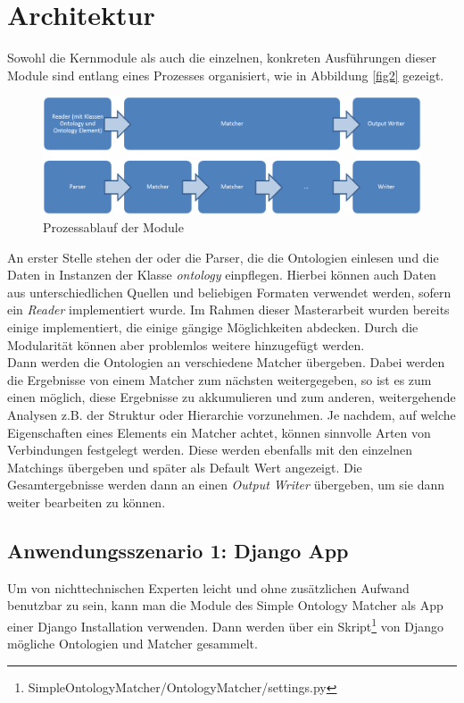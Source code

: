 		\section{Architektur}
		Sowohl die Kernmodule als auch die einzelnen, konkreten Ausführungen dieser
		Module sind entlang eines Prozesses organisiert, wie in Abbildung \ref{fig2}
		gezeigt.
		\begin{figure}[h!]
		\centering
		\includegraphics[width=1.0\textwidth]{pics/Module-overview.png}
		\caption{Prozessablauf der Module}
		\label{fig1}
		\end{figure}
		An erster Stelle stehen der oder die Parser, die die Ontologien einlesen und
		die Daten in Instanzen der Klasse \textit{ontology} einpflegen. Hierbei können
		auch Daten aus unterschiedlichen Quellen und beliebigen Formaten verwendet
		werden, sofern ein \textit{Reader} implementiert wurde. Im Rahmen dieser
		Masterarbeit wurden bereits einige implementiert, die einige gängige
		Möglichkeiten abdecken. Durch die Modularität können aber problemlos weitere
		hinzugefügt werden.\\
		Dann werden die Ontologien an verschiedene Matcher übergeben. Dabei werden
		die Ergebnisse von einem Matcher zum nächsten weitergegeben, so ist es zum
		einen möglich, diese Ergebnisse zu akkumulieren und zum
		anderen, weitergehende Analysen z.B. der Struktur oder Hierarchie vorzunehmen. Je nachdem, auf welche Eigenschaften
		eines Elements ein Matcher achtet, können sinnvolle Arten von Verbindungen
		festgelegt werden. Diese werden ebenfalls mit den einzelnen Matchings
		übergeben und später als Default Wert angezeigt. Die Gesamtergebnisse werden
		dann an einen \textit{Output Writer} übergeben, um sie dann weiter bearbeiten zu können.\\
		
		\cleardoublepage
		\pagebreak[4]
		
		\subsection{Anwendungsszenario 1: Django App}
		Um von nichttechnischen Experten leicht und ohne zusätzlichen Aufwand
		benutzbar zu sein, kann man die Module des Simple Ontology Matcher als App
		einer Django Installation verwenden. Dann werden über ein
		Skript\footnote{SimpleOntologyMatcher/OntologyMatcher/settings.py} von Django mögliche Ontologien und Matcher gesammelt.
		
